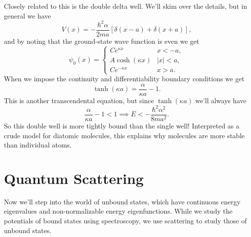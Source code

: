 \documentclass[../p052main.tex]{subfiles}
\begin{document}
Closely related to this is the double delta well.
We'll skim over the details, but in general we have
\[ V(x) = -\frac{\hbar^2 \alpha}{2ma} \left[ \delta (x-a) + \delta (x+a) \right], \]
and by noting that the ground-state wave function is even we get
\[ \psi_0(x) = \begin{cases} Ce^{\kappa x} & x < -a, \\ A \cosh (\kappa x) & |x| < a, \\ Ce^{-\kappa x} & x > a. \end{cases} \]
When we impose the continuity and differentiability boundary conditions we get
\[ \tanh (\kappa a) = \frac{\alpha}{\kappa a} - 1. \]
This is another transcendental equation, but since $\tanh (\kappa a)$ we'll always have
\[ \frac{\alpha}{\kappa a} - 1 < 1 \implies E < -\frac{\hbar^2 \alpha^2}{8ma^2}. \]
So this double well is more tightly bound than the single well!
Interpreted as a crude model for diatomic molecules, this explains why molecules are more stable than individual atoms.

\section{Quantum Scattering}
Now we'll step into the world of unbound states, which have continuous energy eigenvalues and non-normalizable energy eigenfunctions.
While we study the potentials of bound states using spectroscopy, we use scattering to study those of unbound states.
\end{document}
